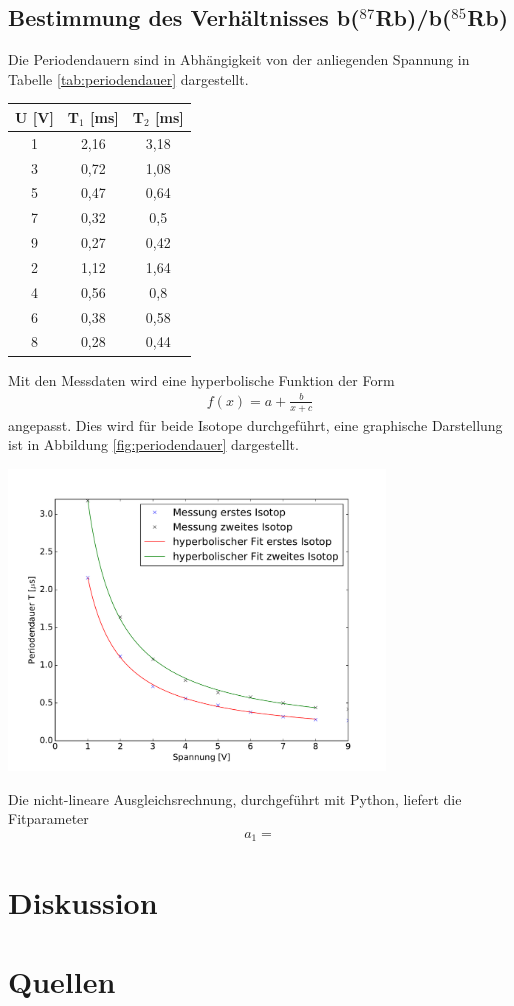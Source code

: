 \documentclass[]{scrartcl}
\begin{document}
\subsection{Bestimmung des Verhältnisses b($^{87}$Rb)/b($^{85}$Rb)}
Die Periodendauern sind in Abhängigkeit von der anliegenden Spannung in Tabelle \ref{tab:periodendauer} dargestellt. 
\begin{center}
	\begin{tabular}{|c|c|c|}
	\hline U [V] & T$_1$ [ms] & T$_2$ [ms] \\
	\hline	1	&	2,16	&	3,18	\\
	\hline	3	&	0,72	&	1,08	\\
	\hline	5	&	0,47	&	0,64	\\
	\hline	7	&	0,32	&	0,5	\\
	\hline	9	&	0,27	&	0,42	\\
	\hline	2	&	1,12	&	1,64	\\
	\hline	4	&	0,56	&	0,8	\\
	\hline	6	&	0,38	&	0,58	\\
	\hline	8	&	0,28	&	0,44	\\
	\hline 
	\end{tabular}
\label{tab:periodendauer}
\end{center}
Mit den Messdaten wird eine hyperbolische Funktion der Form
\begin{align*}
f(x)=a+\frac{b}{x+c}
\end{align*}
angepasst. Dies wird für beide Isotope durchgeführt, eine graphische Darstellung ist in Abbildung \ref{fig:periodendauer} dargestellt.
\begin{center}
	\includegraphics[width=10cm]{images/plot2.pdf}
	\label{fig:periodendauer}
\end{center}
Die nicht-lineare Ausgleichsrechnung, durchgeführt mit Python, liefert die Fitparameter
\begin{align*}
a_1=
\end{align*}

\section{Diskussion}

\section{Quellen}
\end{document}
